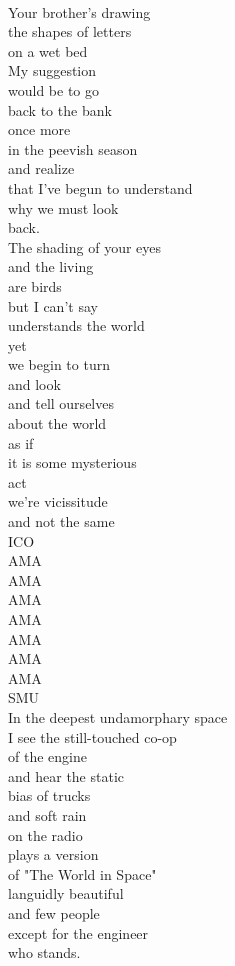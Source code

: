 \documentclass[smalldemyvopaper,11pt,twoside,onecolumn,openright,extrafontsizes]{memoir}
\begin{document}
\\Your brother's drawing
\\the shapes of letters
\\on a wet bed
\\My suggestion
\\would be to go
\\back to the bank
\\once more
\\in the peevish season
\\and realize
\\that I've begun to understand
\\why we must look
\\back.
\\The shading of your eyes
\\and the living
\\are birds
\\but I can't say
\\understands the world
\\yet
\\we begin to turn
\\and look
\\and tell ourselves
\\about the world
\\as if
\\it is some mysterious
\\act
\\we're vicissitude
\\and not the same
\\ICO
\\AMA
\\AMA
\\AMA
\\AMA
\\AMA
\\AMA
\\AMA
\\SMU
\\In the deepest undamorphary space
\\I see the still-touched co-op
\\of the engine
\\and hear the static
\\bias of trucks
\\and soft rain
\\on the radio
\\plays a version
\\of "The World in Space"
\\languidly beautiful
\\and few people
\\except for the engineer
\\who stands.
\end{document}
